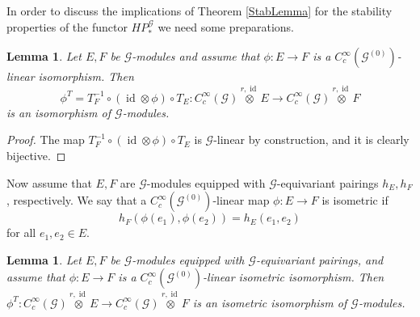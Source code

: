 \documentclass{amsart}
\newtheorem{lemma}[thm]{Lemma}
\newcommand{\G}{\mathcal{G}}
\newcommand{\ccinfty}{C_c^\infty}
\DeclareMathOperator{\id}{id}
\begin{document}
In order to discuss the implications of Theorem \ref{StabLemma} for the stability properties of the functor $ HP^\G_* $ we need some preparations. 

\begin{lemma} \label{automaticequivariance}
Let $ E,F $ be $ \G $-modules and assume that $ \phi: E \rightarrow F $ is a $ \ccinfty(\G^{(0)}) $-linear isomorphism. 
Then 
$$ 
\phi^T = T_F^{-1} \circ (\id \otimes \phi) \circ T_E: \ccinfty(\G) \stackrel{r,\id}{\otimes} E \rightarrow \ccinfty(\G) \stackrel{r,\id}{\otimes} F 
$$ 
is an isomorphism of $ \G $-modules. 
\end{lemma}

\begin{proof}
The map $ T_F^{-1} \circ (\id \otimes \phi) \circ T_E $ is $ \G $-linear by construction, and it is clearly bijective. 
\end{proof}

Now assume that $ E, F $ are $ \G $-modules equipped with $ \G $-equivariant pairings $ h_E, h_F $, respectively. We say that a $ \ccinfty(\G^{(0)}) $-linear map $ \phi: E \rightarrow F $ is isometric if 
$$ 
h_F(\phi(e_1), \phi(e_2)) = h_E(e_1, e_2)  
$$
for all $ e_1, e_2 \in E $. 

\begin{lemma} \label{automaticequivariancepairing}
Let $ E, F $ be $ \G $-modules equipped with $ \G $-equivariant pairings, and assume that $ \phi: E \rightarrow F $ is a $ \ccinfty(\G^{(0)}) $-linear isometric isomorphism. Then $ \phi^T: \ccinfty(\G) \stackrel{r,\id}{\otimes} E \rightarrow \ccinfty(\G) \stackrel{r,\id}{\otimes} F $ is an isometric isomorphism of $ \G $-modules. 
\end{lemma}
\end{document}
